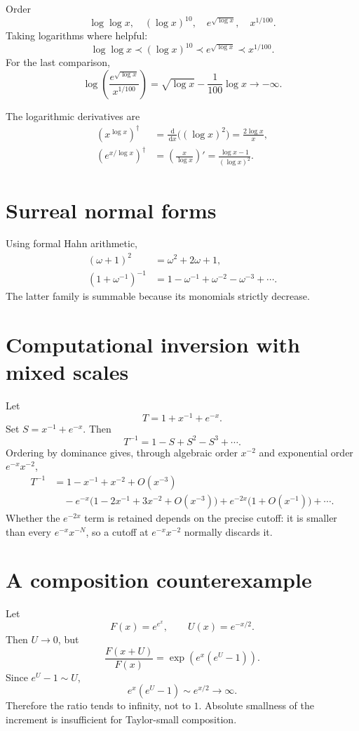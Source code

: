 \documentclass[11pt,openany]{book}
\theoremstyle{definition}
\theoremstyle{plain}
\theoremstyle{remark}
\newcommand{\dd}{\,\mathrm{d}}
\newcommand{\precdom}{\prec}
\begin{document}
Order
\[
 \log\log x,
 \quad(\log x)^{10},
 \quad e^{\sqrt{\log x}},
 \quad x^{1/100}.
\]
Taking logarithms where helpful:
\[
 \log\log x
 \precdom(\log x)^{10}
 \precdom e^{\sqrt{\log x}}
 \precdom x^{1/100}.
\]
For the last comparison,
\[
 \log\left(\frac{e^{\sqrt{\log x}}}{x^{1/100}}\right)
 =\sqrt{\log x}-\frac1{100}\log x\to-\infty.
\]

The logarithmic derivatives are
\begin{align*}
 (x^{\log x})^\dagger
 &=\frac{\dd}{\dd x}\bigl((\log x)^2\bigr)
 =\frac{2\log x}{x},\\
 \left(e^{x/\log x}\right)^\dagger
 &=\left(\frac{x}{\log x}\right)'
 =\frac{\log x-1}{(\log x)^2}.
\end{align*}

\section{Surreal normal forms}

Using formal Hahn arithmetic,
\begin{align*}
 (\omega+1)^2&=\omega^2+2\omega+1,\\
 (1+\omega^{-1})^{-1}
 &=1-\omega^{-1}+\omega^{-2}-\omega^{-3}+\cdots.
\end{align*}
The latter family is summable because its monomials strictly decrease.

\section{Computational inversion with mixed scales}

Let
\[
 T=1+x^{-1}+e^{-x}.
\]
Set $S=x^{-1}+e^{-x}$. Then
\[
 T^{-1}=1-S+S^2-S^3+\cdots.
\]
Ordering by dominance gives, through algebraic order $x^{-2}$ and exponential order $e^{-x}x^{-2}$,
\begin{align*}
 T^{-1}
 &=1-x^{-1}+x^{-2}+O(x^{-3})\\
 &\quad-e^{-x}\bigl(1-2x^{-1}+3x^{-2}+O(x^{-3})\bigr)
 +e^{-2x}\bigl(1+O(x^{-1})\bigr)+\cdots.
\end{align*}
Whether the $e^{-2x}$ term is retained depends on the precise cutoff: it is smaller than every $e^{-x}x^{-N}$, so a cutoff at $e^{-x}x^{-2}$ normally discards it.

\section{A composition counterexample}

Let
\[
 F(x)=e^{e^x},
 \qquad U(x)=e^{-x/2}.
\]
Then $U\to0$, but
\[
 \frac{F(x+U)}{F(x)}
 =\exp\left(e^x(e^U-1)\right).
\]
Since $e^U-1\sim U$,
\[
 e^x(e^U-1)\sim e^{x/2}\to\infty.
\]
Therefore the ratio tends to infinity, not to $1$. Absolute smallness of the increment is insufficient for Taylor-small composition.
\end{document}
